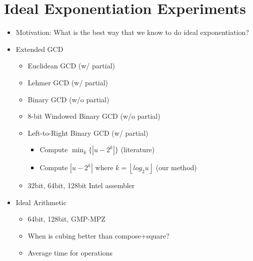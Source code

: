 \documentclass[11pt, letterpaper]{article}
\theoremstyle{definition}
\newcommand{\floor}[1]{\left\lfloor #1 \right\rfloor}
\begin{document}
\bigbreak
\section{Ideal Exponentiation Experiments}

\begin{itemize}
\item Motivation: What is the best way that we know to do ideal exponentiation?  

\item Extended GCD
	\begin{itemize}
	\item Euclidean GCD (w/ partial)
	\item Lehmer GCD (w/ partial)
	\item Binary GCD (w/o partial)
	\item 8-bit Windowed Binary GCD (w/o partial)
	\item Left-to-Right Binary GCD (w/ partial)
		\begin{itemize}
		\item Compute $\min_k \{ |u-2^k| \}$ (literature)
		\item Compute $|u-2^k|$ where $k=\floor{log_2 u}$ (our method)
		\end{itemize}
	\item 32bit, 64bit, 128bit Intel assembler
	\end{itemize}
	
	
\item Ideal Arithmetic
	\begin{itemize}
	\item 64bit, 128bit, GMP-MPZ
	\item When is cubing better than compose+square?
	\item Average time for operations
	\end{itemize}	
	

\end{itemize}
\end{document}
